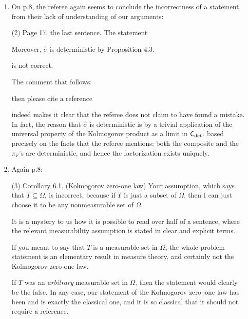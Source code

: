 \documentclass[11pt]{article}
\begin{document}
\begin{enumerate}[resume,label=(\alph*).]
		Perhaps the referee's point is that this preservation condition never appears in the context of Kolmogorov's extension theorem. This is true, and the reason is simple: it \emph{automatically holds} in $\BorelStoch$, as we have explained in Example 3.6. Hence there is no reason to state it explicitly in the standard probability context.
	\item On p.8, the referee again seems to conclude the incorrectness of a statement from their lack of understanding of our arguments:
		\begin{displayquote}
		(2) Page 17, the last sentence. The statement
			\begin{displayquote}
			Moreover, $\hat{\sigma}$ is deterministic by Proposition 4.3.
			\end{displayquote}
		is not correct.
		\end{displayquote}
		The comment that follows:
			\begin{displayquote}
				then please cite a reference	
			\end{displayquote}
		indeed makes it clear that the referee does not claim to have found a mistake. In fact, the reason that $\hat{\sigma}$ is deterministic is by a trivial application of the universal property of the Kolmogorov product as a limit in $\mathsf{C}_{\det}$, based precisely on the facts that the referee mentions: both the composite and the $\pi_F$'s are deterministic, and hence the factorization exists uniquely.
	\item Again p.8:
		\begin{displayquote}
			(3) Corollary 6.1. (Kolmogorov zero-one law) Your assumption, which says that
			$T \subseteq \Omega$, is incorrect, because if $T$ is just a subset of $\Omega$, then I can just choose
			it to be any nonmeasurable set of $\Omega$.
		\end{displayquote}
		It is a mystery to us how it is possible to read over half of a sentence, where the relevant measurability assumption is stated in clear and explicit terms.
		\begin{displayquote}
			If you
			meant to say that $T$ is a measurable set in $\Omega$, the whole problem statement is an
			elementary result in measure theory, and certainly not the Kolmogorov zero-one
			law.
		\end{displayquote}
		If $T$ was an \emph{arbitrary} measurable set in $\Omega$, then the statement would clearly be the false. In any case, our statement of the Kolmogorov zero--one law has been and is exactly the classical one, and it is so classical that it should not require a reference.

\end{enumerate}
\end{document}
